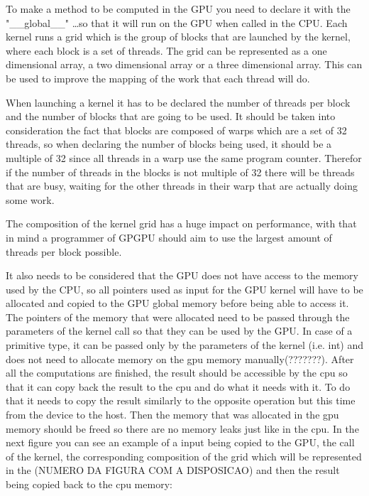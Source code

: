 \documentclass[runningheads]{llncs}
\begin{document}
To make a method to be computed in the GPU you need to declare it with the "\_\_global\_\_" \dots so that it will run on the GPU when called in the CPU. Each kernel runs a grid which is the group of blocks that are launched by the kernel, where each block is a set of threads. The grid can be represented as a one dimensional array, a two dimensional array or a three dimensional array. This can be used to improve the mapping of the work that each thread will do. 

When launching a kernel it has to be declared the number of threads per block and the number of blocks that are going to be used. It should be taken into consideration the fact that blocks are composed of warps which are a set of 32 threads, so when declaring the number of blocks being used, it should be a multiple of 32 since all threads in a warp use the same program counter. Therefor if the number of threads in the blocks is not multiple of 32 there will be threads that are busy, waiting for the other threads in their warp that are actually doing some work.

The composition of the kernel grid has a huge impact on performance, with that in mind a programmer of GPGPU should aim to use the largest amount of threads per block possible.

It also needs to be considered that the GPU does not have access to the memory used by the CPU, so all pointers used as input for the GPU kernel will have to be allocated and copied to the GPU global memory before being able to access it. The pointers of the memory that were allocated need to be passed through the parameters of the kernel call so that they can be used by the GPU. In case of a primitive type, it can be passed only by the parameters of the kernel (i.e. int) and does not need to allocate memory on the gpu memory manually(???????). After all the computations are finished, the result should be accessible by the cpu so that it can copy back the result to the cpu and do what it needs with it. To do that it needs to copy the result similarly to the opposite operation but this time from the device to the host. Then the memory that was allocated in the gpu memory should be freed so there are no memory leaks just like in the cpu. In the next figure you can see an example of a input being copied to the GPU, the call of the kernel, the corresponding composition of the grid which will be represented in the (NUMERO DA FIGURA COM A DISPOSICAO) and then the result being copied back to the cpu memory:
\newline
\end{document}
